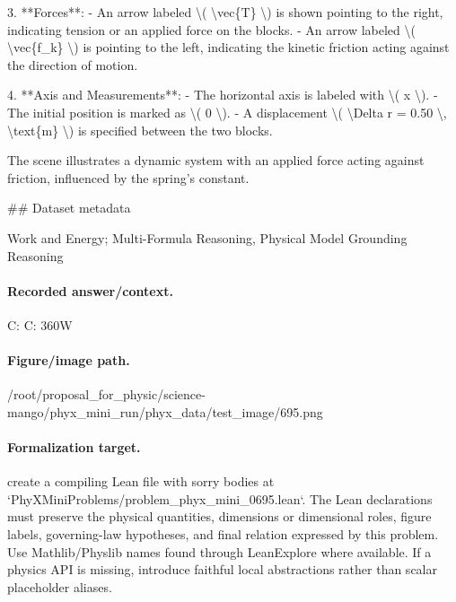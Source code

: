 3. **Forces**:
   - An arrow labeled \textbackslash{}( \textbackslash{}vec\{T\} \textbackslash{}) is shown pointing to the right, indicating tension or an applied force on the blocks.
   - An arrow labeled \textbackslash{}( \textbackslash{}vec\{f\_k\} \textbackslash{}) is pointing to the left, indicating the kinetic friction acting against the direction of motion.

4. **Axis and Measurements**:
   - The horizontal axis is labeled with \textbackslash{}( x \textbackslash{}).
   - The initial position is marked as \textbackslash{}( 0 \textbackslash{}).
   - A displacement \textbackslash{}( \textbackslash{}Delta r = 0.50 \textbackslash{}, \textbackslash{}text\{m\} \textbackslash{}) is specified between the two blocks.

The scene illustrates a dynamic system with an applied force acting against friction, influenced by the spring's constant.

\#\# Dataset metadata

Work and Energy; Multi-Formula Reasoning, Physical Model Grounding Reasoning

\paragraph{Recorded answer/context.}
C: C: 360W

\paragraph{Figure/image path.}
/root/proposal\_for\_physic/science-mango/phyx\_mini\_run/phyx\_data/test\_image/695.png

\paragraph{Formalization target.}
create a compiling Lean file with sorry bodies at `PhyXMiniProblems/problem\_phyx\_mini\_0695.lean`. The Lean declarations must preserve the physical quantities, dimensions or dimensional roles, figure labels, governing-law hypotheses, and final relation expressed by this problem.
Use Mathlib/Physlib names found through LeanExplore where available. If a physics API is missing, introduce faithful local abstractions rather than scalar placeholder aliases.

